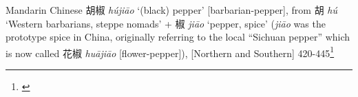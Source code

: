 \begin{etymology}\label{ety:hujiao}
Mandarin Chinese {胡椒} \textit{hú​jiāo} `(black) pepper' [barbarian-pepper], from 胡 \textit{hú​} `Western barbarians, steppe nomads' + 椒 \textit{jiāo} `pepper, spice' (\textit{jiāo} was the prototype spice in China, originally referring to the local ``Sichuan pepper'' which is now called 花椒 \textit{huājiāo} [flower-pepper]), [Northern and Southern] 420-445\footnote{\textcite{schuessler_abc_2007}}
\end{etymology}